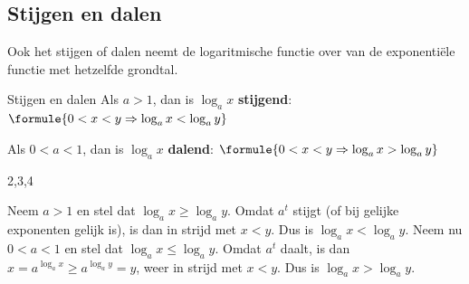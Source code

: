 \subsection{Stijgen en dalen}

Ook het stijgen of dalen neemt de logaritmische functie over van de exponentiële functie met hetzelfde grondtal.

\begin{theorie}
\begin{stelling}{Stijgen en dalen}
Als $a > 1$, dan is $\log_a x$ \textbf{stijgend}: \qquad $\formule{0 < x < y \Rightarrow \log_a x < \log_a y}$

Als $0 < a < 1$, dan is $\log_a x$ \textbf{dalend}: \qquad $\formule{0 < x < y \Rightarrow \log_a x > \log_a y}$
\end{stelling}
\begin{alleenvoor}{2,3,4}
\begin{bewijs}
Neem $a > 1$ en stel dat $\log_a x \geqslant \log_a y$. Omdat $a^t$ stijgt (of bij gelijke exponenten gelijk is), is dan
in strijd met $x < y$. Dus is $\log_a x < \log_a y$. Neem nu $0 < a < 1$ en stel dat $\log_a x \leqslant \log_a y$. Omdat $a^t$ daalt, is dan $x = a^{\log_a x} \geqslant a^{\log_a y} = y$, weer in strijd met $x < y$. Dus is $\log_a x > \log_a y$.
\end{bewijs}
\end{alleenvoor}
\end{theorie}


